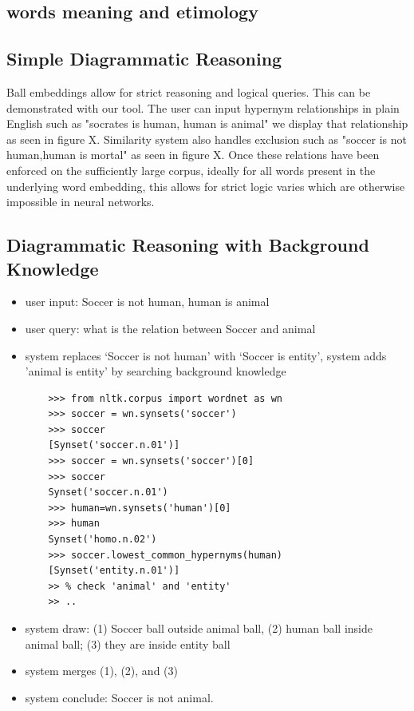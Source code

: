 \documentclass[]{article}
\begin{document}
\subsection{words meaning and etimology}

\subsection{Simple Diagrammatic Reasoning}

Ball embeddings allow for strict reasoning and logical queries. This can be demonstrated with our tool. The user can input hypernym relationships in plain English such as "socrates is human, human is animal" we display that relationship as seen in figure X. Similarity system also handles exclusion such as "soccer is not human,human is mortal" as seen in figure X. Once these relations have been enforced on the sufficiently large corpus, ideally for all words present in the underlying word embedding, this allows for strict logic varies which are otherwise impossible in neural networks.

\subsection{Diagrammatic Reasoning with Background Knowledge} 
\begin{itemize}
	\item user input: Soccer is not human, human is animal
	\item  user query: what is the relation between Soccer and animal
	\item  system replaces `Soccer is not human' with `Soccer is entity', system adds 'animal is entity' by searching background knowledge
	\begin{verbatim}
	>>> from nltk.corpus import wordnet as wn
	>>> soccer = wn.synsets('soccer')
	>>> soccer
	[Synset('soccer.n.01')]
	>>> soccer = wn.synsets('soccer')[0]
	>>> soccer
	Synset('soccer.n.01')
	>>> human=wn.synsets('human')[0]
	>>> human
	Synset('homo.n.02') 
	>>> soccer.lowest_common_hypernyms(human)
	[Synset('entity.n.01')] 
	>> % check 'animal' and 'entity'
	>> ..
	\end{verbatim}
	\item  system draw: (1) Soccer ball outside animal ball, (2) human ball inside animal ball; (3) they are inside entity ball 
	\item system merges (1), (2), and (3)  
	\item system conclude: Soccer is not animal.
\end{itemize}
\end{document}
